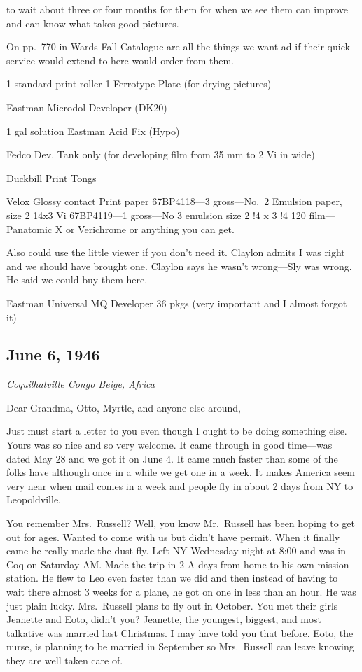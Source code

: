 \documentclass[
]{book}
\begin{document}
to wait about three or four months for them for when we see them can improve and can know what takes good pictures.

On pp.~770 in Wards Fall Catalogue are all the things we want ad if their quick service would extend to here would order from them.

1 standard print roller 1 Ferrotype Plate (for drying pictures)

Eastman Microdol Developer (DK20)

1 gal solution Eastman Acid Fix (Hypo)

Fedco Dev. Tank only (for developing film from 35 mm to 2 Vi in wide)

Duckbill Print Tongs

Velox Glossy contact Print paper 67BP4118---3 gross---No.~2 Emulsion paper, size 2 14x3 Vi 67BP4119---1 gross---No 3 emulsion size 2 !4 x 3 !4 120 film---Panatomic X or Verichrome or anything you can get.

Also could use the little viewer if you don't need it. Claylon admits I was right and we should have brought one. Claylon says he wasn't wrong---Sly was wrong. He said we could buy them here.

Eastman Universal MQ Developer 36 pkgs (very important and I almost forgot it)

\hypertarget{june-6-1946}{%
\subsection{June 6, 1946}\label{june-6-1946}}

\emph{Coquilhatville Congo Beige, Africa}

Dear Grandma, Otto, Myrtle, and anyone else around,

Just must start a letter to you even though I ought to be doing something else. Yours was so nice and so very welcome. It came through in good time---was dated May 28 and we got it on June 4. It came much faster than some of the folks have although once in a while we get one in a week. It makes America seem very near when mail comes in a week and people fly in about 2 days from NY to Leopoldville.

You remember Mrs.~Russell? Well, you know Mr.~Russell has been hoping to get out for ages. Wanted to come with us but didn't have permit. When it finally came he really made the dust fly. Left NY Wednesday night at 8:00 and was in Coq on Saturday AM. Made the trip in 2 A days from home to his own mission station. He flew to Leo even faster than we did and then instead of having to wait there almost 3 weeks for a plane, he got on one in less than an hour. He was just plain lucky. Mrs.~Russell plans to fly out in October. You met their girls Jeanette and Eoto, didn't you? Jeanette, the youngest, biggest, and most talkative was married last Christmas. I may have told you that before. Eoto, the nurse, is planning to be married in September so Mrs.~Russell can leave knowing they are well taken care of.
\end{document}
